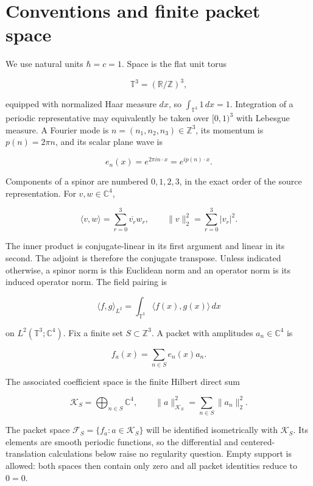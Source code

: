 \hypertarget{conventions-and-finite-packet-space}{%
\section{Conventions and finite packet
space}\label{conventions-and-finite-packet-space}}

We use natural units \(\hbar=c=1\). Space is the flat unit torus

\[
\mathbb T^3=(\mathbb R/\mathbb Z)^3,
\]

equipped with normalized Haar measure \(dx\), so
\(\int_{\mathbb T^3}1\,dx=1\). Integration of a periodic representative
may equivalently be taken over \([0,1)^3\) with Lebesgue measure. A
Fourier mode is \(n=(n_1,n_2,n_3)\in\mathbb Z^3\), its momentum is
\(p(n)=2\pi n\), and its scalar plane wave is

\[
e_n(x)=e^{2\pi i n\cdot x}=e^{i p(n)\cdot x}.
\]

Components of a spinor are numbered \(0,1,2,3\), in the exact order of
the source representation. For \(v,w\in\mathbb C^4\),

\[
\langle v,w\rangle=\sum_{r=0}^{3}\overline{v_r}w_r,
\qquad
\|v\|_2^2=\sum_{r=0}^{3}|v_r|^2.
\]

The inner product is conjugate-linear in its first argument and linear
in its second. The adjoint is therefore the conjugate transpose. Unless
indicated otherwise, a spinor norm is this Euclidean norm and an
operator norm is its induced operator norm. The field pairing is

\[
\langle f,g\rangle_{L^2}
=\int_{\mathbb T^3}\langle f(x),g(x)\rangle\,dx
\]

on \(L^2(\mathbb T^3;\mathbb C^4)\). Fix a finite set
\(S\subset\mathbb Z^3\). A packet with amplitudes \(a_n\in\mathbb C^4\)
is

\[
f_a(x)=\sum_{n\in S}e_n(x)a_n.
\]

The associated coefficient space is the finite Hilbert direct sum

\[
\mathcal K_S=\bigoplus_{n\in S}\mathbb C^4,
\qquad
\|a\|_{\mathcal K_S}^2=\sum_{n\in S}\|a_n\|_2^2.
\]

The packet space \(\mathcal F_S=\{f_a:a\in\mathcal K_S\}\) will be
identified isometrically with \(\mathcal K_S\). Its elements are smooth
periodic functions, so the differential and centered-translation
calculations below raise no regularity question. Empty support is
allowed: both spaces then contain only zero and all packet identities
reduce to \(0=0\).

